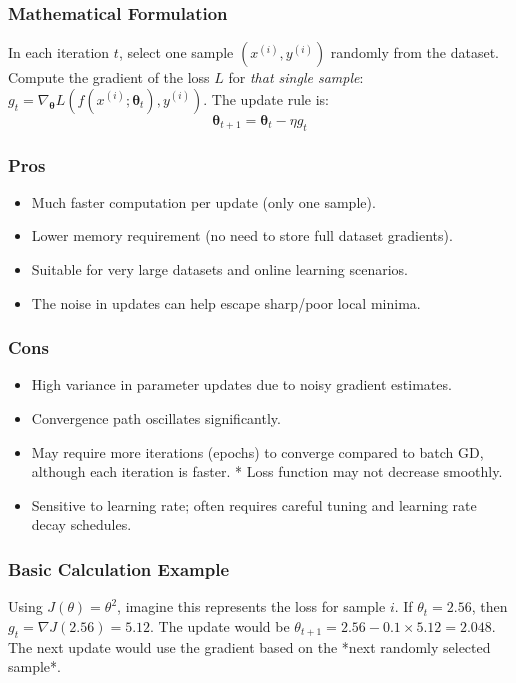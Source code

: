 \documentclass{article}
\newcommand{\btheta}{\bm{\theta}}
\begin{document}
\subsubsection{Mathematical Formulation}
In each iteration $t$, select one sample $(x^{(i)}, y^{(i)})$ randomly from the dataset. Compute the gradient of the loss $L$ for \emph{that single sample}: $g_t = \nabla_{\btheta} L(f(x^{(i)}; \btheta_t), y^{(i)})$. The update rule is:
\begin{equation}
    \btheta_{t+1} = \btheta_t - \eta g_t
\end{equation}

\subsubsection{Pros}
\begin{itemize}
    \item Much faster computation per update (only one sample).
    \item Lower memory requirement (no need to store full dataset gradients).
    \item Suitable for very large datasets and online learning scenarios.
    \item The noise in updates can help escape sharp/poor local minima.
\end{itemize}

\subsubsection{Cons}
\begin{itemize}
    \item High variance in parameter updates due to noisy gradient estimates.
    \item Convergence path oscillates significantly.
    \item May require more iterations (epochs) to converge compared to batch GD, although each iteration is faster.
    * Loss function may not decrease smoothly.
    \item Sensitive to learning rate; often requires careful tuning and learning rate decay schedules.
\end{itemize}

\subsubsection{Basic Calculation Example}
Using $J(\theta) = \theta^2$, imagine this represents the loss for sample $i$. If $\theta_t = 2.56$, then $g_t = \nabla J(2.56) = 5.12$. The update would be $\theta_{t+1} = 2.56 - 0.1 \times 5.12 = 2.048$. The next update would use the gradient based on the *next randomly selected sample*.
\end{document}
